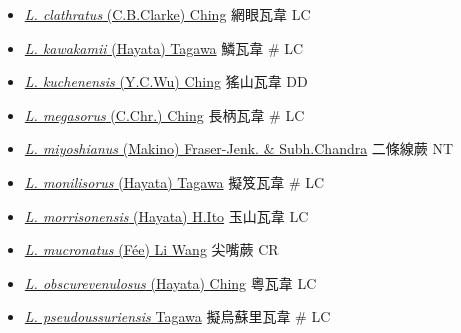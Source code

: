 \begin{itemize}
  \begin{itemize}
        \item[] \href{http://www.theplantlist.org/tpl1.1/search?q=Lepisorus+clathratus}{\textit{L. clathratus} (C.B.Clarke) Ching}   網眼瓦韋   LC
        \item[] \href{http://www.theplantlist.org/tpl1.1/search?q=Lepisorus+kawakamii}{\textit{L. kawakamii} (Hayata) Tagawa}   鱗瓦韋  \# LC
        \item[] \href{http://www.theplantlist.org/tpl1.1/search?q=Lepisorus+kuchenensis}{\textit{L. kuchenensis} (Y.C.Wu) Ching}   猺山瓦韋   DD
        \item[] \href{http://www.theplantlist.org/tpl1.1/search?q=Lepisorus+megasorus}{\textit{L. megasorus} (C.Chr.) Ching}   長柄瓦韋  \# LC
        \item[] \href{http://www.theplantlist.org/tpl1.1/search?q=Lepisorus+miyoshianus}{\textit{L. miyoshianus} (Makino) Fraser-Jenk. \& Subh.Chandra}   二條線蕨   NT
        \item[] \href{http://www.theplantlist.org/tpl1.1/search?q=Lepisorus+monilisorus}{\textit{L. monilisorus} (Hayata) Tagawa}   擬笈瓦韋  \# LC
        \item[] \href{http://www.theplantlist.org/tpl1.1/search?q=Lepisorus+morrisonensis}{\textit{L. morrisonensis} (Hayata) H.Ito}   玉山瓦韋   LC
        \item[] \href{http://www.theplantlist.org/tpl1.1/search?q=Lepisorus+mucronatus}{\textit{L. mucronatus} (Fée) Li Wang}   尖嘴蕨   CR
        \item[] \href{http://www.theplantlist.org/tpl1.1/search?q=Lepisorus+obscurevenulosus}{\textit{L. obscurevenulosus} (Hayata) Ching}   粵瓦韋   LC
        \item[] \href{http://www.theplantlist.org/tpl1.1/search?q=Lepisorus+pseudoussuriensis}{\textit{L. pseudoussuriensis} Tagawa}   擬烏蘇里瓦韋  \# LC

\end{itemize}
\end{itemize}
